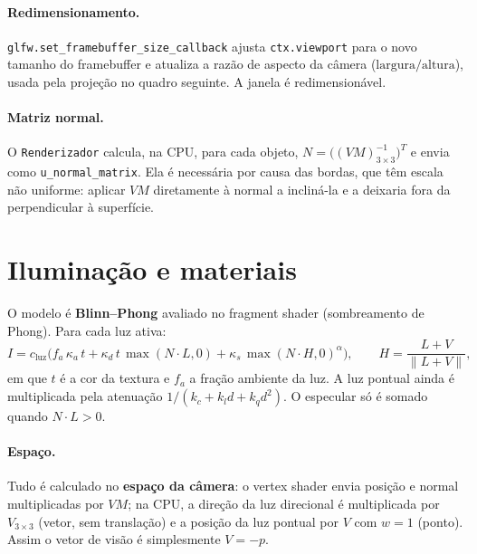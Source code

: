 \documentclass[a4paper,11pt]{article}
\begin{document}
\paragraph{Redimensionamento.} \texttt{glfw.set\_framebuffer\_size\_callback}
ajusta \texttt{ctx.viewport} para o novo tamanho do framebuffer e atualiza a
razão de aspecto da câmera ($\text{largura}/\text{altura}$), usada pela
projeção no quadro seguinte. A janela é redimensionável.

\paragraph{Matriz normal.} O \texttt{Renderizador} calcula, na CPU, para cada
objeto, $N = \big((V M)_{3\times3}^{-1}\big)^{T}$ e envia como
\texttt{u\_normal\_matrix}. Ela é necessária por causa das bordas, que têm escala
não uniforme: aplicar $VM$ diretamente à normal a incliná-la e a deixaria fora da
perpendicular à superfície.

\section{Iluminação e materiais}
O modelo é \textbf{Blinn--Phong} avaliado no fragment shader (sombreamento de
Phong). Para cada luz ativa:
\[
I = c_{\text{luz}}\big(f_a\,\kappa_a\,t
  + \kappa_d\,t\,\max(N\!\cdot\!L,0)
  + \kappa_s\,\max(N\!\cdot\!H,0)^{\alpha}\big),
\qquad H = \frac{L+V}{\lVert L+V\rVert},
\]
em que $t$ é a cor da textura e $f_a$ a fração ambiente da luz. A luz pontual
ainda é multiplicada pela atenuação $1/(k_c + k_l d + k_q d^2)$. O especular
só é somado quando $N\cdot L>0$.

\paragraph{Espaço.} Tudo é calculado no \textbf{espaço da câmera}: o vertex
shader envia posição e normal multiplicadas por $V M$; na CPU, a direção da luz
direcional é multiplicada por $V_{3\times3}$ (vetor, sem translação) e a posição
da luz pontual por $V$ com $w=1$ (ponto). Assim o vetor de visão é
simplesmente $V = -p$.
\end{document}
